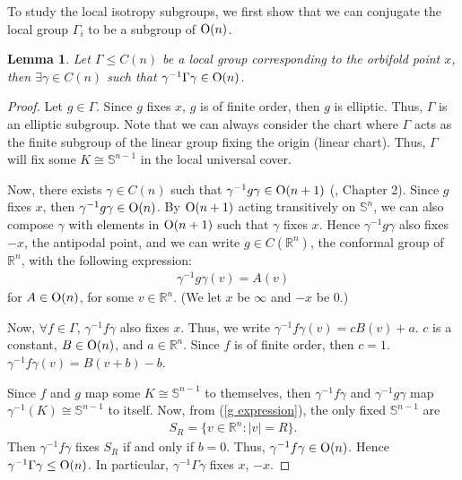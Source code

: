\documentclass[12pt]{amsart}
\newtheorem{lemma}[theorem]{Lemma}
\theoremstyle{definition}
\begin{document}
To study the local isotropy subgroups, we first show that we can conjugate the local group $\Gamma_i$ to be a subgroup of ${\rm{O}}(n)$.
\begin{lemma}\label{local group}
    Let $\Gamma\leq C(n)$ be a local group corresponding to the orbifold point $x$, then $\exists \gamma\in C(n)$ such that $\gamma^{-1}\Gamma\gamma\in {\rm{O}}(n)$.
\end{lemma}
\begin{proof}
    Let $g\in \Gamma$. Since $g$ fixes $x$, $g$ is of finite order, then $g$ is elliptic. Thus, $\Gamma$ is an elliptic subgroup. Note that we can always consider the chart where $\Gamma$ acts as the finite subgroup of the linear group fixing the origin (linear chart). Thus, $\Gamma$ will fix some $K\cong \mathbb{S}^{n-1}$ in the local universal cover.
    
    Now, there exists $\gamma\in C(n)$ such that $\gamma^{-1}g\gamma\in {\rm{O}}(n+1)$ (\cite{conformalbook}, Chapter 2). Since $g$ fixes $x$, then $\gamma^{-1}g\gamma\in {\rm{O}}(n)$. By ${\rm{O}}(n+1)$ acting transitively on $\mathbb{S}^n$, we can also compose $\gamma$ with elements in ${\rm{O}}(n+1)$ such that $\gamma$ fixes $x$. Hence $\gamma^{-1}g\gamma$ also fixes $-x$, the antipodal point, and we can write $g\in C(\mathbb{R}^n)$, the conformal group of $\mathbb{R}^n$, with the following expression:
    \begin{align}\label{g expression}
            \gamma^{-1}g\gamma(v)=A(v)
    \end{align}
    for $A\in {\rm{O}}(n)$, for some $v\in \mathbb{R}^n$. (We let $x$ be $\infty$ and $-x$ be $0$.) 
    
    Now, $\forall f\in\Gamma$, $\gamma^{-1} f\gamma$ also fixes $x$. Thus, we write $\gamma^{-1}f\gamma(v)=cB(v)+a$. $c$ is a constant, $B\in {\rm{O}}(n)$, and $a\in\mathbb{R}^n$. Since $f$ is of finite order, then $c=1$. $\gamma^{-1}f\gamma(v)=B(v+b)-b$. 
    
    
    Since $f$ and $g$ map some $K\cong \mathbb{S}^{n-1}$ to themselves, then $\gamma^{-1}f\gamma$ and $\gamma^{-1}g\gamma$ map $\gamma^{-1}(K)\cong\mathbb{S}^{n-1}$ to itself. Now, from (\ref{g expression}), the only fixed $\mathbb{S}^{n-1}$ are
    \begin{align*}
            S_R = \{v\in\mathbb{R}^n:|v|=R\}.
    \end{align*}
    Then $\gamma^{-1}f\gamma$ fixes $S_R$ if and only if $b=0$. Thus, $\gamma^{-1}f\gamma\in {\rm{O}}(n)$. Hence $\gamma^{-1}\Gamma\gamma\leq {\rm{O}}(n)$. In particular, $\gamma^{-1}\Gamma\gamma$ fixes $x$, $-x$.
\end{proof}
\end{document}
